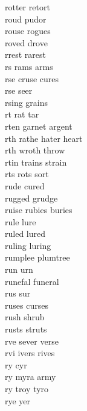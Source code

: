 rotter retort\\
roud pudor \\
rouse rogues \\
roved drove\\
rrest rarest \\
rs rams arms  \\
rse cruse cures  \\
rse seer \\
rsing grains \\
rt rat tar \\
rten garnet argent  \\
rth rathe hater heart  \\
rth wroth throw  \\
rtin trains strain  \\
rts rots sort \\
rude cured \\
rugged grudge\\
ruise rubies buries \\
rule lure\\
ruled lured\\
ruling luring\\
rumplee plumtree \\
run urn\\
runefal funeral\\
rus sur\\
ruses curses \\
rush shrub \\
rusts struts \\
rve sever verse  \\
rvi ivers rives  \\
ry cyr \\
ry myra army  \\
ry troy tyro  \\
rye yer\\


